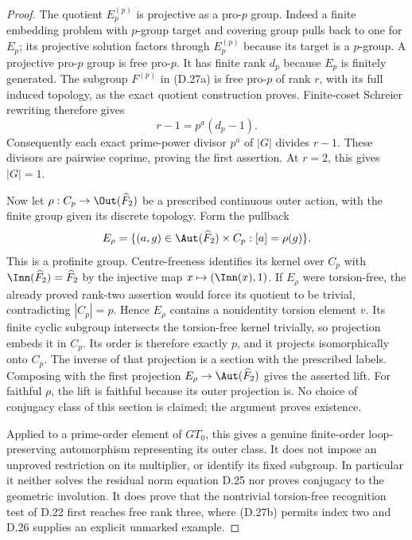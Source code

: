 \begin{proof}
The quotient $E_p^{(p)}$ is projective as a pro-$p$ group. Indeed a
finite embedding problem with $p$-group target and covering group
pulls back to one for $E_p$; its projective solution factors through
$E_p^{(p)}$ because its target is a $p$-group. A projective pro-$p$
group is free pro-$p$. It has finite rank $d_p$ because $E_p$ is
finitely generated. The subgroup $F^{(p)}$ in (D.27a) is free
pro-$p$ of rank $r$, with its full induced topology, as the exact
quotient construction proves. Finite-coset Schreier rewriting
therefore gives
\[
                         r-1=p^a(d_p-1).          \tag{D.27b}
\]
Consequently each exact prime-power divisor $p^a$ of $|G|$ divides
$r-1$. These divisors are pairwise coprime, proving the first
assertion. At $r=2$, this gives $|G|=1$.

Now let $\rho:C_p\to\Out(\widehat F_2)$ be a prescribed continuous
outer action, with the finite group given its discrete topology.
Form the pullback
\[
 E_\rho=\{(a,g)\in\Aut(\widehat F_2)\times C_p:
                         [a]=\rho(g)\}.
\]
This is a profinite group. Centre-freeness identifies its kernel
over $C_p$ with $\Inn(\widehat F_2)=\widehat F_2$ by the injective
map $x\mapsto(\Inn(x),1)$. If $E_\rho$ were torsion-free, the
already proved rank-two assertion would force its quotient to be
trivial, contradicting $|C_p|=p$. Hence $E_\rho$ contains a
nonidentity torsion element $v$. Its finite cyclic subgroup
intersects the torsion-free kernel trivially, so projection embeds
it in $C_p$. Its order is therefore exactly $p$, and it projects
isomorphically onto $C_p$. The inverse of that projection is a
section with the prescribed labels. Composing with the first
projection $E_\rho\to\Aut(\widehat F_2)$ gives the asserted lift.
For faithful $\rho$, the lift is faithful because its outer
projection is. No choice of conjugacy class of this section is
claimed; the argument proves existence.

Applied to a prime-order element of $GT_0$, this gives a genuine
finite-order loop-preserving automorphism representing its outer
class. It does not impose an unproved restriction on its multiplier,
or identify its fixed subgroup. In particular it neither solves
the residual norm equation D.25 nor proves conjugacy to the
geometric involution. It does prove that the nontrivial
torsion-free recognition test of D.22 first reaches free rank
three, where (D.27b) permits index two and D.26 supplies an
explicit unmarked example.
\end{proof}

